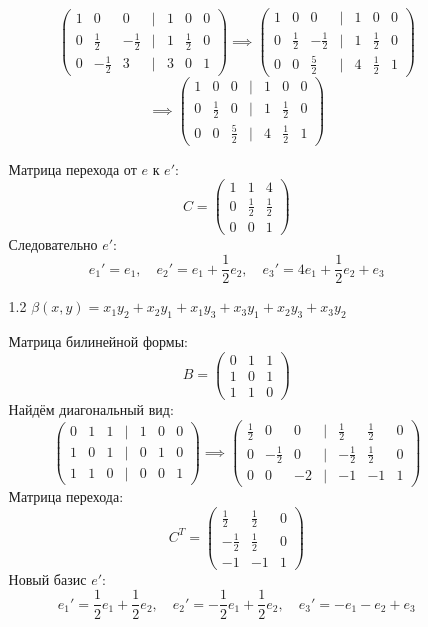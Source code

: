 \documentclass[a4paper]{article}
\newcommand{\mat}[1]{\begin{pmatrix} #1 \end{pmatrix}}
\renewcommand{\f}[2]{\frac{#1}{#2}}
\begin{document}
\begin{enumerate}
\begin{enumerate}
$$\begin{pmatrix}
            1 & 0 & 0 & | & 1 &0 & 0\\
            0 & \f{1}{2} & -\f{1}{2} &| & 1 & \f{1}{2} & 0\\
            0 & -\f{1}{2} & 3 & | & 3 & 0 & 1
            \end{pmatrix}\implies \begin{pmatrix}
                1 & 0 & 0 & | & 1 &0 & 0\\
                0 & \f{1}{2} & -\f{1}{2} &| & 1 & \f{1}{2} & 0\\
                0 & 0 & \f{5}{2} & | & 4 & \f{1}{2} & 1
                \end{pmatrix}$$
        $$\implies \begin{pmatrix}
            1 & 0 & 0 & | & 1 &0 & 0\\
            0 & \f{1}{2} & 0 &| & 1 & \f{1}{2} & 0\\
            0 & 0 & \f{5}{2} & | & 4 & \f{1}{2} & 1
            \end{pmatrix}$$
        
        Матрица перехода от $e$ к $e'$:
        $$C = \mat{
            1&1&4\\
            0&\f{1}{2}&\f{1}{2}\\
            0&0&1
        }$$
        Следовательно $e'$:
        $$e_1' = e_1, \quad e_2' = e_1+\f{1}{2}e_2, \quad e_3' = 4e_1+ \f{1}{2}e_2 + e_3$$
        
        \item[1.2]$ \beta(x, y) = x_{1} y_{2} + x_{2} y_{1} + x_{1} y_{3} +
         x_{3} y_{1} + x_{2} y_{3} + x_{3} y_{2} $
         
         Матрица билинейной формы:
         $$B = \mat{0 & 1 & 1 \\
         1&0&1\\
         1&1&0}$$
         Найдём диагональный вид:
        $$\mat{0 & 1 & 1 & | & 1 & 0 &0\\
        1&0&1&| & 0 & 1 & 0\\
        1&1&0 & | & 0 & 0 & 1}\implies \mat{\f{1}{2} & 0 & 0 & | & \f{1}{2} & \f{1}{2} &0\\
        0&-\f{1}{2}&0&| & -\f{1}{2} & \f{1}{2} & 0\\
        0&0&-2 & | & -1 & -1 & 1}$$
        Матрица перехода:
        $$C^T = \mat{\f{1}{2} & \f{1}{2} &0\\
       -\f{1}{2} & \f{1}{2} & 0\\
         -1 & -1 & 1}$$
        Новый базис $e'$:
        $$e_1' = \f{1}{2}e_1+\f{1}{2}e_2, \quad e_2' = -\f{1}{2}e_1+\f{1}{2}e_2, 
        \quad e_3' = -e_1-e_2+e_3$$


\end{enumerate}
\end{enumerate}
\end{document}
